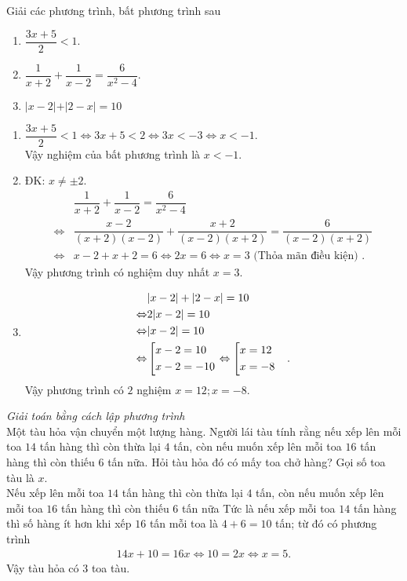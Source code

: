 \begin{ex}%
    Giải các phương trình, bất phương trình sau
    \begin{enumerate}
        \item $\dfrac{3x+5}{2}<1$.
        \item $\dfrac{1}{x+2}+\dfrac{1}{x-2}=\dfrac{6}{x^2-4}$.
        \item $\vert x-2\vert+\vert 2-x\vert=10$
    \end{enumerate}
\loigiai
    {
    \begin{enumerate}
        \item $\dfrac{3x+5}{2}<1\Leftrightarrow 3x+5<2\Leftrightarrow 3x<-3\Leftrightarrow x<-1$.\\
        Vậy nghiệm của bất phương trình là $x<-1$.
        \item ĐK: $x\ne \pm 2$.\\
        \begin{align*}
        &\dfrac{1}{x+2}+\dfrac{1}{x-2}=\dfrac{6}{x^2-4}\\
        \Leftrightarrow& \dfrac{x-2}{(x+2)(x-2)}+\dfrac{x+2}{(x-2)(x+2)}=\dfrac{6}{(x-2)(x+2)}\\
        \Leftrightarrow&x-2+x+2=6\Leftrightarrow 2x=6\Leftrightarrow x=3 \text{ (Thỏa mãn điều kiện) }.
        \end{align*}
        Vậy phương trình có nghiệm duy nhất $x=3$.
        \item 
        \begin{align*}
        &\vert x-2\vert+\vert 2-x\vert=10&\\
        \Leftrightarrow& 2\vert x-2\vert=10&\\
        \Leftrightarrow& \vert x-2\vert=10&\\
        \Leftrightarrow&\left[\begin{aligned}&x-2=10\\&x-2=-10\end{aligned}\right.\Leftrightarrow\left[\begin{aligned}&x=12\\&x=-8\end{aligned}\right.&.
        \end{align*}
        Vậy phương trình có $2$ nghiệm $x=12;x=-8$.
    \end{enumerate}
    }
\end{ex}

\begin{ex}%
\textit{Giải toán bằng cách lập phương trình}\\
Một tàu hỏa vận chuyển một lượng hàng. Người lái tàu tính rằng nếu xếp lên mỗi toa $14$ tấn hàng thì còn thừa lại $4$ tấn, còn nếu muốn xếp lên mỗi toa $16$ tấn hàng thì còn thiếu $6$ tấn nữa. Hỏi tàu hỏa đó có mấy toa chở hàng?
\loigiai
    {
 Gọi số toa tàu là $x$.\\
 Nếu xếp lên mỗi toa $14$ tấn hàng thì còn thừa lại $4$ tấn, còn nếu muốn xếp lên mỗi toa $16$ tấn hàng thì còn thiếu $6$ tấn nữa
 Tức là nếu xếp mỗi toa $14$ tấn hàng thì số hàng ít hơn khi xếp $16$ tấn mỗi toa là $4+6=10$ tấn; từ đó có phương trình
 \begin{align*}
 14x+10=16x\Leftrightarrow 10=2x\Leftrightarrow x=5.
 \end{align*}
 Vậy tàu hỏa có $3$ toa tàu.
    }
\end{ex}

